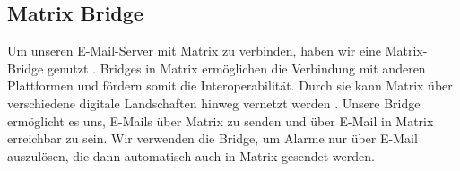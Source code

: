 \subsection{Matrix Bridge}
Um unseren E-Mail-Server mit Matrix zu verbinden, haben wir eine Matrix-Bridge genutzt \cite{jojii_jojiiofficialmatrix-emailbridge_2024}. Bridges in Matrix ermöglichen die Verbindung mit anderen Plattformen und fördern somit die Interoperabilität. Durch sie kann Matrix über verschiedene digitale Landschaften hinweg vernetzt werden \cite{noauthor_bridges_nodate}. Unsere Bridge ermöglicht es uns, E-Mails über Matrix zu senden und über E-Mail in Matrix erreichbar zu sein. Wir verwenden die Bridge, um Alarme nur über E-Mail auszulösen, die dann automatisch auch in Matrix gesendet werden.
